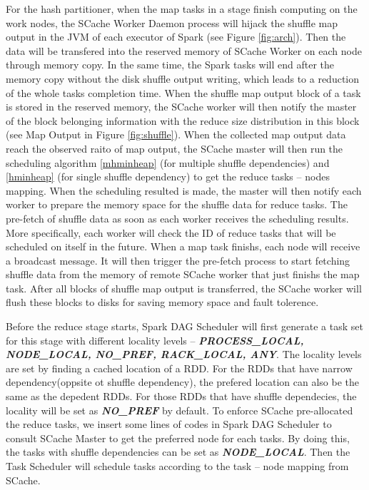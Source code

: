For the hash partitioner, when the map tasks in a stage finish computing on the work nodes, the  SCache Worker Daemon process will hijack the shuffle map output in the JVM of each executor of Spark (see Figure \ref{fig:arch}). Then the data will be transfered into the reserved memory of SCache Worker on each node through memory copy. In the same time, the Spark tasks will end after the memory copy without the disk shuffle output writing, which leads to a  reduction of the whole tasks completion time. When the shuffle map output block of a task is stored in the reserved memory, the SCache worker will then notify the master of the block belonging information with the reduce size distribution in this block (see Map Output in Figure \ref{fig:shuffle}). When the collected map output data reach the observed raito of map output, the SCache master will then run the scheduling algorithm \ref{mhminheap} (for multiple shuffle dependencies) and \ref{hminheap} (for single shuffle dependency) to get the reduce tasks -- nodes mapping. When the scheduling resulted is made, the master will then notify each worker to prepare the memory space for the shuffle data for reduce tasks. The pre-fetch of shuffle data as soon as each worker receives the scheduling results. More specifically, each worker will check the ID of reduce tasks that will be scheduled on itself in the future. When a map task finishs, each node will receive a broadcast message. It will then trigger the pre-fetch process to start fetching shuffle data from the memory of remote SCache worker that just finishs the map task. After all blocks of shuffle map output is transferred, the SCache worker will flush these blocks to disks for saving memory space and fault tolerence. 

Before the reduce stage starts, Spark DAG Scheduler will first generate a task set for this stage with different locality levels -- \textbf{\textit{PROCESS\_LOCAL, NODE\_LOCAL, NO\_PREF, RACK\_LOCAL, ANY}}. The locality levels are set by finding a cached location of a RDD. For the RDDs that have narrow dependency(oppsite ot shuffle dependency), the prefered location can also be the same as the depedent RDDs. For those RDDs that have shuffle dependecies, the locality will be set as \textbf{\textit{NO\_PREF}} by default. To enforce SCache pre-allocated the reduce tasks, we insert some lines of codes in Spark DAG Scheduler to consult SCache Master to get the preferred node for each tasks. By doing this, the tasks with shuffle dependencies can be set as \textbf{\textit{NODE\_LOCAL}}. Then the Task Scheduler will schedule tasks according to the task -- node mapping from SCache. 

